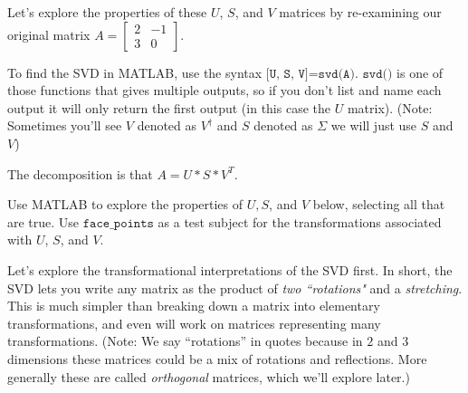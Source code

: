 \documentclass{ximera}
\begin{document}
Let's explore the properties of these $U$, $S$, and $V$ matrices by re-examining our original matrix $A=\begin{bmatrix} 2 & -1 \\ 3 & 0\end{bmatrix}$.

To find the SVD in MATLAB, use the syntax $\texttt{[U, S, V]=svd(A)}$. $\texttt{svd()}$ is one of those functions that gives multiple outputs, so if you don't list and name each output it will only return the first output (in this case the $U$ matrix). (Note: Sometimes you'll see $V$ denoted as $V^\dagger$ and $S$ denoted as $\Sigma$ we will just use $S$ and $V$)

The decomposition is that $A=U*S*V^{T}$. 

\begin{problem}
Use MATLAB to explore the properties of $U, S$, and $V$ below, selecting all that are true. Use $\texttt{face\_points}$ as a test subject for the transformations associated with $U$, $S$, and $V$.

\begin{selectAll}


\end{selectAll}

\begin{feedback}

  Let's explore the transformational interpretations of the SVD first. In short, the SVD lets you write any matrix as the product of \emph{two ``rotations"} and a \emph{stretching}. This is much simpler than breaking down a matrix into elementary transformations, and even will work on matrices representing many transformations. (Note: We say ``rotations'' in quotes because in $2$ and $3$ dimensions these matrices could be a mix of rotations and reflections. More generally these are called \emph{orthogonal} matrices, which we'll explore later.)


\end{feedback}
\end{problem}
\end{document}
